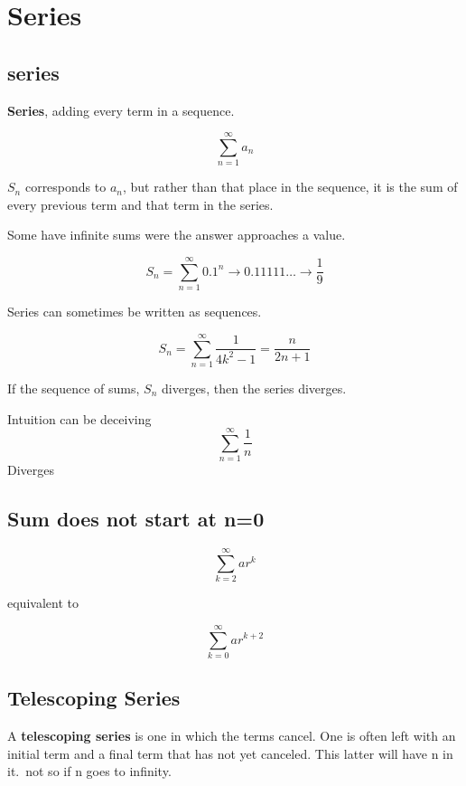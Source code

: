 \section{Series}
\subsection{series}

\textbf{Series}, adding every term in a sequence.


\[ \sum_{n=1}^{\infty} a_{n} \]

$S_{n}$ corresponds to $a_{n}$, but rather than that place in the sequence, it is the sum of every previous term and that term in the series.


Some have infinite sums were the answer approaches a value.

\begin{equation}
	\label{}
	S_{n}= \sum_{n=1}^{\infty} 0.1^{n} \to 0.11111\ldots \to \frac{1}{9}
\end{equation}

Series can sometimes be written as sequences.

\begin{equation}
	\label{}
S_{n}=\sum_{n=1}^{\infty} \frac{1}{4k^{2}-1}=\frac{n}{2n+1}	
\end{equation}

If the sequence of sums, $S_{n}$ diverges, then the series diverges.


Intuition can be deceiving
\begin{equation}
	\label{}
\sum_{n=1}^{\infty}\frac{1}{n}
\end{equation}
Diverges

\subsection{Sum does not start at n=0}
\begin{equation}
	\label{}
\sum_{k=2}^{\infty}a r^k	
\end{equation}

equivalent to

\begin{equation}
	\label{}	
	\sum_{k=0}^{\infty}a r^{k+2}
\end{equation}

\subsection{Telescoping Series}
A \textbf{telescoping series} is one in which the terms cancel. One is often left with an initial term and a final term that has not yet canceled. This latter will have n in it.\ not so if n goes to infinity.

